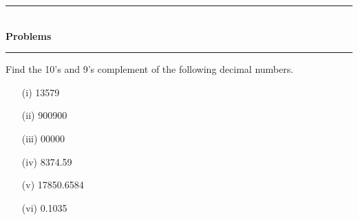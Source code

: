 \begin{center}
\rule{4cm}{1pt}\\
{\bf\Large Problems}\\[-3pt]
\rule{4cm}{1pt}
\end{center}

\begin{problem}\label{prob5.23}
Find the 10's and 9's complement of the following decimal numbers.
\begin{itemize}
\item[(i)] 13579

\item[(ii)] 900900

\item[(iii)] 00000

\item[(iv)] 8374.59

\item[(v)] 17850.6584

\item[(vi)] 0.1035
\end{itemize}
\end{problem}

